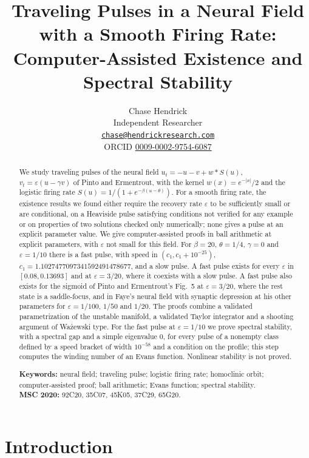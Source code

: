 \documentclass[11pt]{article}
\title{\Large\bfseries Traveling Pulses in a Neural Field with a Smooth Firing Rate:\\ Computer-Assisted Existence and Spectral Stability}
\author{Chase Hendrick\\[0.2em] {\small Independent Researcher}\\ {\small\href{mailto:chase@hendrickresearch.com}{\texttt{chase@hendrickresearch.com}}}\\ {\small ORCID \href{https://orcid.org/0009-0002-9754-6087}{0009-0002-9754-6087}}}
\date{}
\theoremstyle{definition}
\newcommand{\eps}{\varepsilon}
\begin{document}
\maketitle

\begin{abstract}
We study traveling pulses of the neural field $u_t = -u - v + w * S(u)$, $v_t = \eps(u - \gamma v)$ of Pinto and Ermentrout, with the kernel $w(x) = e^{-|x|}/2$ and the logistic firing rate $S(u) = 1/(1 + e^{-\beta(u - \theta)})$. For a smooth firing rate, the existence results we found either require the recovery rate $\eps$ to be sufficiently small or are conditional, on a Heaviside pulse satisfying conditions not verified for any example or on properties of two solutions checked only numerically; none gives a pulse at an explicit parameter value. We give computer-assisted proofs in ball arithmetic at explicit parameters, with $\eps$ not small for this field. For $\beta = 20$, $\theta = 1/4$, $\gamma = 0$ and $\eps = 1/10$ there is a fast pulse, with speed in $(c_1, c_1 + 10^{-25})$, $c_1 = 1.1027477097341592491478677$, and a slow pulse. A fast pulse exists for every $\eps$ in $[0.08, 0.13693]$ and at $\eps = 3/20$, where it coexists with a slow pulse. A fast pulse also exists for the sigmoid of Pinto and Ermentrout's Fig.~5 at $\eps = 3/20$, where the rest state is a saddle-focus, and in Faye's neural field with synaptic depression at his other parameters for $\eps = 1/100$, $1/50$ and $1/20$. The proofs combine a validated parametrization of the unstable manifold, a validated Taylor integrator and a shooting argument of Wa\.zewski type. For the fast pulse at $\eps = 1/10$ we prove spectral stability, with a spectral gap and a simple eigenvalue $0$, for every pulse of a nonempty class defined by a speed bracket of width $10^{-58}$ and a condition on the profile; this step computes the winding number of an Evans function. Nonlinear stability is not proved.

\medskip
\noindent\textbf{Keywords:} neural field; traveling pulse; logistic firing rate; homoclinic orbit; computer-assisted proof; ball arithmetic; Evans function; spectral stability.\\
\textbf{MSC 2020:} 92C20, 35C07, 45K05, 37C29, 65G20.
\end{abstract}

\section{Introduction}\label{sec:intro}
\end{document}
